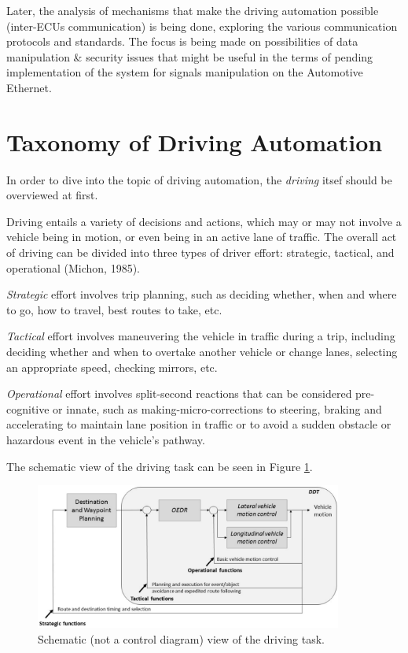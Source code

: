 Later, the analysis of mechanisms that make the driving automation possible (inter-ECUs communication) is being done, exploring the various communication protocols and standards.
The focus is being made on possibilities of data manipulation \& security issues that might be useful in the terms of pending implementation of the system for signals manipulation on the Automotive Ethernet.

\section{Taxonomy of Driving Automation}
In order to dive into the topic of driving automation, the \textit{driving} itsef should be overviewed at first.

Driving entails a variety of decisions and actions, which may or may not involve a vehicle being in motion, or even being in an active lane of traffic. 
The overall act of driving can be divided into three types of driver effort: strategic, tactical, and operational (Michon, 1985).

\textit{Strategic} effort involves trip planning, such as deciding whether, when and where to go, how to travel, best routes to take, etc.

\textit{Tactical} effort involves maneuvering the vehicle in traffic during a trip, including deciding whether and when to overtake another vehicle or change lanes, selecting an appropriate speed, checking mirrors, etc.

\textit{Operational} effort involves split-second reactions that can be considered pre-cognitive or innate, such as making-micro-corrections to steering, braking and accelerating to maintain lane position in traffic or to avoid a sudden obstacle or hazardous event in the vehicle’s pathway.

The schematic view of the driving task can be seen in Figure \ref{fig:driving_task}.

\begin{figure}[h]
  \centering
  \includegraphics[width=0.9\textwidth]{images/ddt_explained.PNG}
  \caption{Schematic (not a control diagram) view of the driving task.}
  \label{fig:driving_task}
\end{figure}

